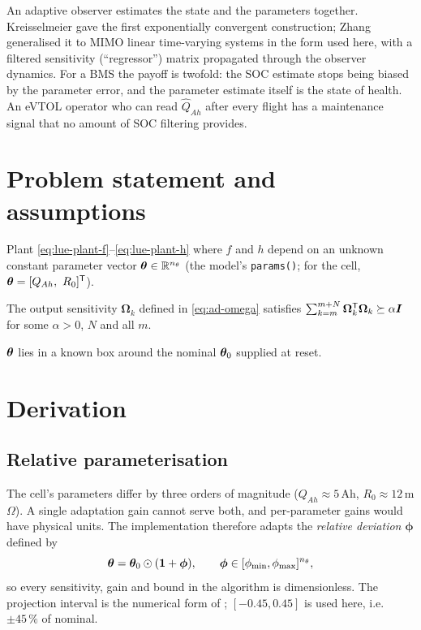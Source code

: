 An adaptive observer estimates the state and the parameters together.  Kreisselmeier
\cite{kreisselmeier1977} gave the first exponentially convergent construction; Zhang
\cite{zhang2002adaptiveobserver} generalised it to MIMO linear time-varying systems in the form
used here, with a filtered sensitivity (``regressor'') matrix propagated through the observer
dynamics.  For a BMS the payoff is twofold: the SOC estimate stops being biased by the parameter
error, and the parameter estimate itself is the state of health.  An eVTOL operator who can read
$\hat{Q}_{Ah}$ after every flight has a maintenance signal that no amount of SOC filtering
provides.

\section{Problem statement and assumptions}
Plant \eqref{eq:lue-plant-f}--\eqref{eq:lue-plant-h} where $f$ and $h$ depend on an unknown
constant parameter vector $\bm{\theta}\in\mathbb{R}^{n_\theta}$ (the model's \texttt{params()}; for the
cell, $\bm{\theta} = [Q_{Ah},\ R_0]^{\mathsf{T}}$).
\begin{assumption}\label{as:ad-pe}
The output sensitivity $\bm{\Omega}_k$ defined in \eqref{eq:ad-omega} satisfies
$\sum_{k=m}^{m+N}\bm{\Omega}_k^{\mathsf{T}}\bm{\Omega}_k \succeq \alpha\bm{I}$ for some $\alpha>0$, $N$ and
all $m$.
\end{assumption}
\begin{assumption}\label{as:ad-range}
$\bm{\theta}$ lies in a known box around the nominal $\bm{\theta}_0$ supplied at reset.
\end{assumption}

\section{Derivation}

\subsection{Relative parameterisation}
The cell's parameters differ by three orders of magnitude ($Q_{Ah}\approx5$\,Ah,
$R_0\approx12$\,m$\Omega$).  A single adaptation gain cannot serve both, and per-parameter gains
would have physical units.  The implementation therefore adapts the \emph{relative deviation}
$\bm{\phi}$ defined by
\begin{equation}
\bm{\theta} = \bm{\theta}_0\odot(\bm{1}+\bm{\phi}) , \qquad
\bm{\phi}\in[\phi_{\min},\phi_{\max}]^{n_\theta} ,
\label{eq:ad-rel}
\end{equation}
so every sensitivity, gain and bound in the algorithm is dimensionless.  The projection interval
is the numerical form of ; $[-0.45,0.45]$ is used here, i.e. $\pm45\,\%$ of
nominal.

